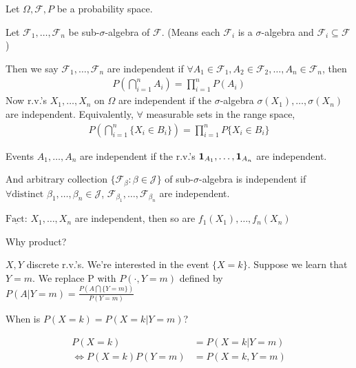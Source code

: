 \documentclass[11pt]{article}
\begin{document}
\begin{definition}
    Let $\Omega, \mathcal{F}, P$ be a probability space. 

    Let $\mathcal{F}_1, \ldots ,\mathcal{F}_n$ be sub-$\sigma$-algebra of $\mathcal{F}$. (Means
    each $\mathcal{F}_i$ is a $\sigma$-algebra and $\mathcal{F}_i \subseteq \mathcal{F}$)

    Then we say $\mathcal{F}_1, \ldots ,\mathcal{F}_n$ are independent if $\forall A_1 \in \mathcal{F}_1,
    A_2 \in \mathcal{F}_2, \ldots ,A_n \in \mathcal{F}_n$, then
    \begin{align*}
        P(\bigcap_{i=1}^{n} A_i) = \prod_{i=1}^{n}P(A_i) 
    \end{align*}
    Now r.v.'s $X_1, \ldots ,X_n$ on $\Omega$ are independent if the $\sigma$-algebra 
    $\sigma(X_1), \ldots ,\sigma(X_n)$ are independent. Equivalently, $\forall $ measurable 
    sets in the range space,
    \begin{align*}
       P(\bigcap_{i=1}^{n}\{X_{i} \in B_i\}) = \prod_{i=1}^{n} P\{X_{i} \in B_i\} 
    \end{align*}
\end{definition}

Events $A_1, \ldots ,A_n$ are independent if the r.v.'s $\bm{1}_{A_1}, \ldots ,\bm{1}_{A_n}$ are independent.

And arbitrary collection $\{\mathcal{F}_{\beta}: \beta \in \mathcal{J}\}$ of sub-$\sigma$-algebra is independent if
$\forall \text{distinct } \beta_1, \ldots ,\beta_{n} \in \mathcal{J}$, $\mathcal{F}_{\beta_{1}}, \ldots ,\mathcal{F}_{\beta_{n}}$
are independent.

\begin{remark}
    $\underline{\text{Fact:}}$ $X_1, \ldots ,X_n$ are independent, then so are 
    $f_1(X_1), \ldots ,f_n(X_n)$
\end{remark}

\begin{remark}
    Why product?

    $X,Y$ discrete r.v.'s. We're interested in the event $\{X=k\}$. Suppose we learn that $Y=m$.
    We replace P with $P(\cdot , Y=m)$ defined by $P(A| Y=m) = \frac{P(A \bigcap \{Y=m\})}{P(Y=m)}$

    When is $P(X=k) = P(X=k | Y=m)$?

    \begin{align*}
        P(X=k) &= P(X=k | Y=m)\\
        \iff P(X=k)P(Y=m) &= P(X=k,Y=m)
    \end{align*}
\end{remark}
\end{document}
